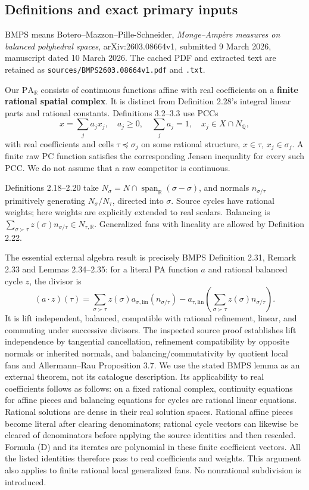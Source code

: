 \documentclass[
  11pt,
]{article}
\begin{document}
\subsection{Definitions and exact primary
inputs}\label{definitions-and-exact-primary-inputs}

BMPS means Botero--Mazzon--Pille-Schneider, \emph{Monge--Ampère measures
on balanced polyhedral spaces}, arXiv:2603.08664v1, submitted 9 March
2026, manuscript dated 10 March 2026. The cached PDF and extracted text
are retained as \texttt{sources/BMPS2603.08664v1.pdf} and \texttt{.txt}.

Our \(\mathrm{PA}_{\mathbb R}\) consists of continuous functions affine
with real coefficients on a \textbf{finite rational spatial complex}. It
is distinct from Definition 2.28's integral linear parts and rational
constants. Definitions 3.2--3.3 use PCCs \[
x=\sum_j a_jx_j,\quad a_j\geq0,\quad\sum_j a_j=1,
\quad x_j\in X\cap N_{\mathbb Q},
\] with real coefficients and cells \(\tau\preceq\sigma_j\) on some
rational structure, \(x\in\tau\), \(x_j\in\sigma_j\). A finite raw PC
function satisfies the corresponding Jensen inequality for every such
PCC. We do not assume that a raw competitor is continuous.

Definitions 2.18--2.20 take
\(N_\sigma=N\cap\operatorname{span}_{\mathbb R}(\sigma-\sigma)\), and
normals \(n_{\sigma/\tau}\) primitively generating \(N_\sigma/N_\tau\),
directed into \(\sigma\). Source cycles have rational weights; here
weights are explicitly extended to real scalars. Balancing is
\(\sum_{\sigma\succ\tau}z(\sigma)n_{\sigma/\tau}\in N_{\tau,\mathbb R}\).
Generalized fans with lineality are allowed by Definition 2.22.

The essential external algebra result is precisely BMPS Definition 2.31,
Remark 2.33 and Lemmas 2.34--2.35: for a literal PA function \(a\) and
rational balanced cycle \(z\), the divisor is \[
(a\cdot z)(\tau)=\sum_{\sigma\succ\tau}z(\sigma)a_{\sigma,\mathrm{lin}}(n_{\sigma/\tau})
-a_{\tau,\mathrm{lin}}\left(\sum_{\sigma\succ\tau}z(\sigma)n_{\sigma/\tau}\right).
\tag{D}
\] It is lift independent, balanced, compatible with rational
refinement, linear, and commuting under successive divisors. The
inspected source proof establishes lift independence by tangential
cancellation, refinement compatibility by opposite normals or inherited
normals, and balancing/commutativity by quotient local fans and
Allermann--Rau Proposition 3.7. We use the stated BMPS lemma as an
external theorem, not its catalogue description. Its applicability to
real coefficients follows as follows: on a fixed rational complex,
continuity equations for affine pieces and balancing equations for
cycles are rational linear equations. Rational solutions are dense in
their real solution spaces. Rational affine pieces become literal after
clearing denominators; rational cycle vectors can likewise be cleared of
denominators before applying the source identities and then rescaled.
Formula (D) and its iterates are polynomial in these finite coefficient
vectors. All the listed identities therefore pass to real coefficients
and weights. This argument also applies to finite rational local
generalized fans. No nonrational subdivision is introduced.
\end{document}
